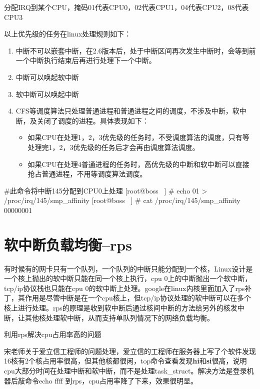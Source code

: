 分配IRQ到某个CPU，掩码01代表CPU0，02代表CPU1，04代表CPU2，08代表CPU3


以上优先级的任务在linux处理规则如下：

\begin{enumerate}
  \item 中断不可以嵌套中断，在2.6版本后，处于中断区间再次发生中断时，会等到前一个中断执行结束后再进行处理下一个中断。
  \item 中断可以唤起软中断
  \item 软中断可以唤起中断
  \item CFS等调度算法只处理普通进程和普通进程之间的调度，不涉及中断，软中断，及关闭了调度的进程。具体表现如下：\begin{itemize}
        \item 如果CPU在处理1，2，3优先级的任务时，不受调度算法的调度，只有等处理完1，2，3优先级的任务后才会再由调度算法调度。
        \item 如果CPU在处理4普通进程的任务时，高优先级的中断和软中断可以直接抢占普通进程，不用等调度算法调度。
        \end{itemize}
\end{enumerate}
\begin{latexcmd}[label= 中断分配到CPU方法]
#此命令将中断145分配到CPU0上处理
[root@boss ~] # echo 01 > /proc/irq/145/smp_affinity
[root@boss ~] # cat /proc/irq/145/smp_affinity
			00000001
\end{latexcmd}
\section{软中断负载均衡--rps}
有时候有的网卡只有一个队列，一个队列的中断只能分配到一个核，Linux设计是一个核上抛出的软中断只能在同一个核上执行，cpu 0上的中断抛出一个软中断，tcp/ip协议栈也只能在cpu 0的软中断上处理。google在linux内核里面加入了rps补丁，其作用是尽管中断是在一个cpu核上，但tcp/ip协议处理的软中断可以在多个核上进行处理。rps的原理是收到软中断后通过核间中断的方法给另外的核发中断，让其他核处理软中断，从而支持单队列情况下的网络负载均衡。
\clearpage
\begin{example*}
  \wdexpbox
  {\caption{利用rps解决cpu占用率高的问题}}
  {宋老师关于爱立信工程师的问题处理，爱立信的工程师在服务器上写了个软件发现16核有2个核占用率很高，但其他核都很闲，top命令查看发现\textbf{hi}和\textbf{si}很高，说明cpu大部分时间在处理中断和软中断，而不是处理task\_struct。解决方法是登录机器后敲命令echo ffff 到rps，cpu占用率降了下来，效果很明显。}
\end{example*}

